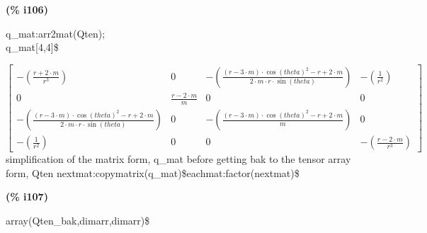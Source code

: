 \documentclass[fleqn]{article}
\begin{document}
\noindent%



\noindent
\begin{minipage}[t]{4.000000em}\color{red}\bfseries
(\% i106)	
\end{minipage}
\begin{minipage}[t]{\textwidth}\color{blue}
q\_mat:arr2mat(Qten);\\
q\_mat[4,4]\$
\end{minipage}
\[\displaystyle \tag{\% o105} 
\begin{bmatrix}\mathop{-}\left( \frac{r\mathop{+}2\mathop{\ensuremath{\cdot}}m}{{{r}^{3}}}\right)  & 0 & \mathop{-}\left( \frac{\left( r\mathop{-}3\mathop{\ensuremath{\cdot}}m\right) \mathop{\ensuremath{\cdot}}{{\cos{(theta)}}^{2}}\mathop{-}r\mathop{+}2\mathop{\ensuremath{\cdot}}m}{2\mathop{\ensuremath{\cdot}}m\mathop{\ensuremath{\cdot}}r\mathop{\ensuremath{\cdot}}\sin{(theta)}}\right)  & \mathop{-}\left( \frac{1}{{{r}^{2}}}\right) \\
0 & \frac{r\mathop{-}2\mathop{\ensuremath{\cdot}}m}{m} & 0 & 0\\
\mathop{-}\left( \frac{\left( r\mathop{-}3\mathop{\ensuremath{\cdot}}m\right) \mathop{\ensuremath{\cdot}}{{\cos{(theta)}}^{2}}\mathop{-}r\mathop{+}2\mathop{\ensuremath{\cdot}}m}{2\mathop{\ensuremath{\cdot}}m\mathop{\ensuremath{\cdot}}r\mathop{\ensuremath{\cdot}}\sin{(theta)}}\right)  & 0 & \mathop{-}\left( \frac{\left( r\mathop{-}3\mathop{\ensuremath{\cdot}}m\right) \mathop{\ensuremath{\cdot}}{{\cos{(theta)}}^{2}}\mathop{-}r\mathop{+}2\mathop{\ensuremath{\cdot}}m}{m}\right)  & 0\\
\mathop{-}\left( \frac{1}{{{r}^{2}}}\right)  & 0 & 0 & \mathop{-}\left( \frac{r\mathop{-}2\mathop{\ensuremath{\cdot}}m}{{{r}^{3}}}\right) \end{bmatrix}\mbox{}
\]
simplification of the matrix form, q\_mat before getting bak to the tensor array form, Qten
nextmat:copymatrix(q\_mat)\$eachmat:factor(nextmat)\$


\noindent
\begin{minipage}[t]{4.000000em}\color{red}\bfseries
(\% i107)	
\end{minipage}
\begin{minipage}[t]{\textwidth}\color{blue}
array(Qten\_bak,dimarr,dimarr)\$
\end{minipage}

\noindent%
\end{document}
